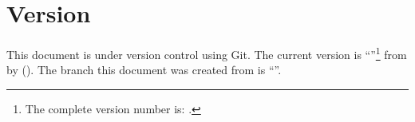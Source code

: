 \chapter{Version}
This document is under version control using Git. The current version is \enquote{\gitAbbrevHash{}}\footnote{The complete version number is: \gitHash{}.} from \gitAuthorDate{} by \gitAuthorName{} (\gitAuthorEmail{}). The branch this document was created from is \enquote{\gitBranch{}}.


